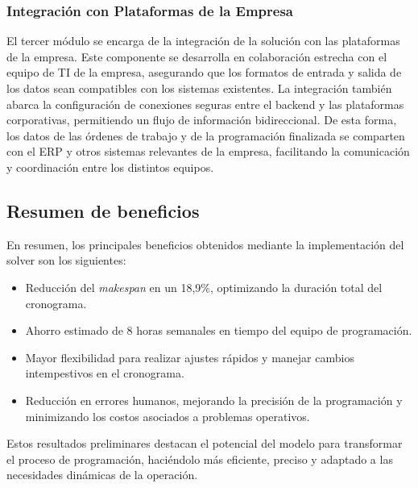 \documentclass{article}
\begin{document}
\subsubsection{Integración con Plataformas de la Empresa}

El tercer módulo se encarga de la integración de la solución con las plataformas de la empresa. Este componente se desarrolla en colaboración estrecha con el equipo de TI de la empresa, asegurando que los formatos de entrada y salida de los datos sean compatibles con los sistemas existentes. La integración también abarca la configuración de conexiones seguras entre el backend y las plataformas corporativas, permitiendo un flujo de información bidireccional. De esta forma, los datos de las órdenes de trabajo y de la programación finalizada se comparten con el ERP y otros sistemas relevantes de la empresa, facilitando la comunicación y coordinación entre los distintos equipos.



\subsection{Resumen de beneficios}

En resumen, los principales beneficios obtenidos mediante la implementación del solver son los siguientes:
\begin{itemize}
    \item Reducción del \textit{makespan} en un 18,9\%, optimizando la duración total del cronograma.
    \item Ahorro estimado de 8 horas semanales en tiempo del equipo de programación.
    \item Mayor flexibilidad para realizar ajustes rápidos y manejar cambios intempestivos en el cronograma.
    \item Reducción en errores humanos, mejorando la precisión de la programación y minimizando los costos asociados a problemas operativos.
\end{itemize}

Estos resultados preliminares destacan el potencial del modelo para transformar el proceso de programación, haciéndolo más eficiente, preciso y adaptado a las necesidades dinámicas de la operación.



\newpage
\end{document}
